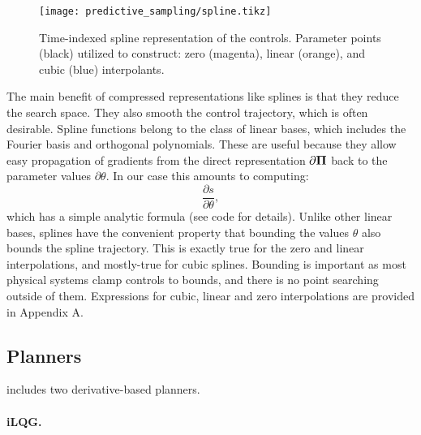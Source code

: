 \begin{figure}[H]
	\centering
	\texttt{[image: predictive\_sampling/spline.tikz]}
	\caption[Spline representation]{Time-indexed spline representation of the controls. Parameter points (black) utilized to construct: zero (magenta), linear (orange), and cubic (blue) interpolants.}
	\label{ps_spline}
\end{figure}

The main benefit of compressed representations like splines is that they reduce the search space. They also smooth the control trajectory, which is often desirable. Spline functions belong to the class of linear bases, which includes the Fourier basis and orthogonal polynomials. These are useful because they allow easy propagation of gradients from the direct representation $\partial {\mathbf{\Pi}}$  back to the parameter values $\partial \theta$. In our case this amounts to computing:
\begin{equation}\label{ps_splinederiv}
	\frac{\partial s}{\partial \theta},
\end{equation}
which has a simple analytic formula (see code for details). Unlike other linear bases, splines have the convenient property that bounding the values $\theta$ also bounds the spline trajectory. This is exactly true for the zero and linear interpolations, and mostly-true for cubic splines. Bounding is important as most physical systems clamp controls to bounds, and there is no point searching outside of them. Expressions for cubic, linear and zero interpolations are provided in Appendix A.


\subsection{Planners}
\app{} includes two derivative-based planners. 

\paragraph{iLQG.}

